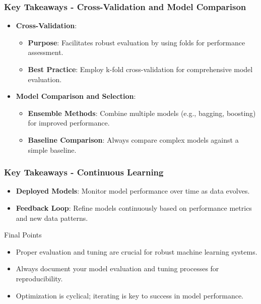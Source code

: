\documentclass{beamer}
\begin{document}
\begin{frame}[fragile]
    \frametitle{Key Takeaways - Cross-Validation and Model Comparison}
    
    \begin{itemize}
        \item \textbf{Cross-Validation}:
        \begin{itemize}
            \item \textbf{Purpose}: Facilitates robust evaluation by using folds for performance assessment.
            \item \textbf{Best Practice}: Employ k-fold cross-validation for comprehensive model evaluation.
        \end{itemize}

        \item \textbf{Model Comparison and Selection}:
        \begin{itemize}
            \item \textbf{Ensemble Methods}: Combine multiple models (e.g., bagging, boosting) for improved performance.
            \item \textbf{Baseline Comparison}: Always compare complex models against a simple baseline.
        \end{itemize}
    \end{itemize}

\end{frame}

\begin{frame}[fragile]
    \frametitle{Key Takeaways - Continuous Learning}
    
    \begin{itemize}
        \item \textbf{Deployed Models}: Monitor model performance over time as data evolves.
        \item \textbf{Feedback Loop}: Refine models continuously based on performance metrics and new data patterns.
    \end{itemize}
    
    \begin{block}{Final Points}
        \begin{itemize}
            \item Proper evaluation and tuning are crucial for robust machine learning systems.
            \item Always document your model evaluation and tuning processes for reproducibility.
            \item Optimization is cyclical; iterating is key to success in model performance.
        \end{itemize}
    \end{block}

\end{frame}
\end{document}
